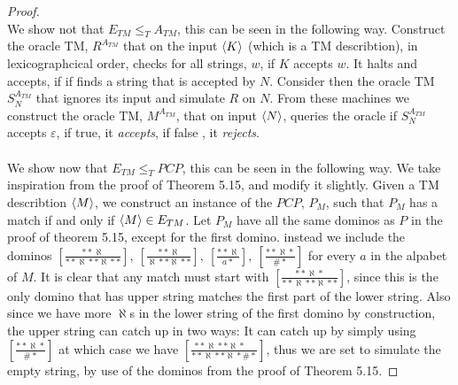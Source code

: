 \documentclass[a4paper,11pt]{article}
\numberwithin{equation}{section}
\begin{document}
\begin{proof}
\\
We show not that $ E_{TM}\leq_T A_{TM} $, this can be seen in the following way. Construct the oracle TM, $ R^{A_{TM}} $ that on the input $ \braket{K} $ (which is a TM describtion), in lexicographcical order, checks for all strings, $ w $, if $ K $ accepts $ w $. It halts and accepts, if if finds a string that is accepted by $ N $. Consider then the oracle TM $ S_N^{A_{TM}} $ that ignores its input and simulate $ R $ on $ N $. From these machines we construct the oracle TM, $ M^{A_{TM}} $, that on input $ \braket{N} $, queries the oracle if $ S_N^{A_{TM}} $ accepts $ \varepsilon $, if true, it \emph{accepts}, if false , it \emph{rejects}.\\
\\
We show now that $ E_{TM}\leq_T PCP $, this can be seen in the following way. We take inspiration from the proof of Theorem 5.15, and modify it slightly. Given a TM describtion $ \braket{M} $, we construct an instance of the $ PCP $, $ P_M $, such that $ P_M $ has a match if and only if $ \braket{M}\in E_{TM} $. 
Let $ P_M $ have all the same dominos as $ P $ in the proof of theorem 5.15, except for the first domino. instead we include the dominos $ \left[\frac{\ast\ast\aleph}{\ast\ast\aleph\ast\ast\aleph\ast\ast}\right],\ \left[\frac{\ast\ast\aleph}{\aleph\ast\ast\aleph\ast\ast}\right],\ \left[\frac{\ast\ast\aleph}{a\ast}\right],\ \left[\frac{\ast\ast\aleph\ast}{\#\ast}\right] $ for every $ a $ in the alpabet of $ M $. It is clear that any match must start with $ \left[\frac{\ast\ast\aleph\ast}{\ast\ast\aleph\ast\ast\aleph\ast\ast}\right] $, since this is the only domino that has upper string matches the first part of the lower string. Also since we have more $ \aleph $s in the lower string of the first domino by construction, the upper string can catch up in two ways: It can catch up by simply using $ \left[\frac{\ast\ast\aleph\ast}{\#\ast}\right]  $ at which case we have $ \left[\frac{\ast\ast\aleph\ast\ast\aleph\ast\quad }{\ast\ast\aleph\ast\ast\aleph\ast\#\ast}\right] $, thus we are set to simulate the empty string, by use of the dominos from the proof of Theorem 5.15.

\end{proof}
\end{document}
